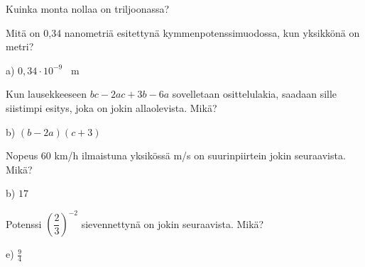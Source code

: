 \begin{tehtava}
Kuinka monta nollaa on triljoonassa?
\begin{alakohdat}
\end{alakohdat}
\end{tehtava}

\begin{tehtava}
Mitä on 0,34 nanometriä esitettynä kymmenpotenssimuodossa, kun yksikkönä on metri?
\begin{alakohdat}
\end{alakohdat}
\begin{vastaus}
a) $0,34 \cdot 10^{-9}$ \, m
\end{vastaus}
\end{tehtava}

\begin{tehtava}
Kun lausekkeeseen $bc-2ac+3b-6a$ sovelletaan osittelulakia, saadaan sille siistimpi esitys, joka on jokin allaolevista. Mikä?
	\begin{alakohdat}
	\end{alakohdat}
    \begin{vastaus}
	b) $(b-2a)(c+3)$
    \end{vastaus}
\end{tehtava}

\begin{tehtava}
Nopeus 60 km/h ilmaistuna yksikössä m/s on suurinpiirtein jokin seuraavista. Mikä?
\begin{alakohdat}
\end{alakohdat}
	\begin{vastaus}
	 b) $17$
	\end{vastaus}
\end{tehtava}

\begin{tehtava}
Potenssi $\left( \dfrac{2}{3} \right)^{-2}$ sievennettynä on jokin seuraavista. Mikä?
\begin{alakohdat}
\end{alakohdat}
\begin{vastaus}
e) $\frac{9}{4}$
\end{vastaus}
\end{tehtava}

